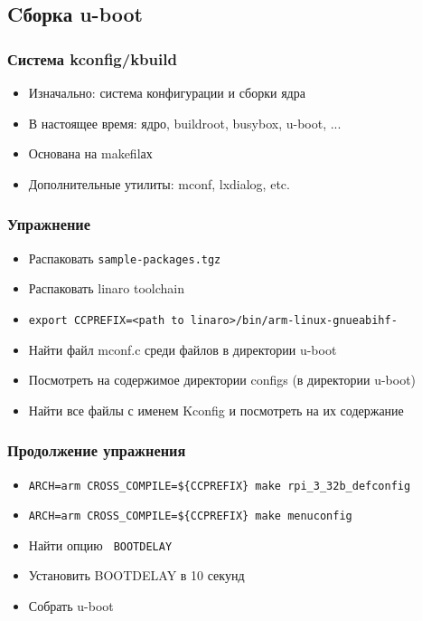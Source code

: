 \subsection{Cборка u-boot}

\begin{frame}
  \frametitle{Система kconfig/kbuild}
  \begin{itemize}
      \item Изначально: система конфигурации и сборки ядра
      \item В настоящее время: ядро, buildroot, busybox, u-boot, ...
      \item Основана на makefilах
      \item Дополнительные утилиты: mconf, lxdialog, etc.
  \end{itemize}
\end{frame}

\begin{frame}[fragile]
  \frametitle{Упражнение}
  \begin{itemize}
    \item Распаковать \texttt{sample-packages.tgz}
    \item Распаковать linaro toolchain
    \item \verb+export CCPREFIX=<path to linaro>/bin/arm-linux-gnueabihf- +
    \item Найти файл mconf.c среди файлов в директории u-boot
    \item Посмотреть на содержимое директории configs (в директории u-boot)
    \item Найти все файлы с именем Kconfig и посмотреть на их содержание
  \end{itemize}

\end{frame}

\begin{frame}[fragile]
  \frametitle{Продолжение упражнения}
  \begin{itemize}
    \item \verb+ARCH=arm CROSS_COMPILE=${CCPREFIX} make rpi_3_32b_defconfig +
    \item \verb+ARCH=arm CROSS_COMPILE=${CCPREFIX} make menuconfig +
    \item Найти опцию \verb+ BOOTDELAY +
    \item Установить BOOTDELAY в 10 секунд
    \item Собрать u-boot
  \end{itemize}
\end{frame}


